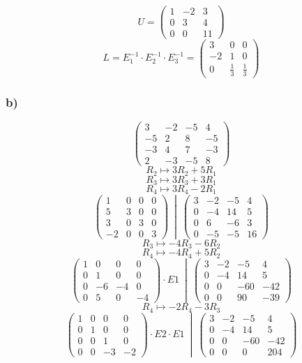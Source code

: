 \documentclass[lineaire_algebra_oplossingen.tex]{subfiles}
\begin{document}
\[ U = 
\begin{pmatrix}
1 & -2 & 3\\
0 & 3 & 4\\
0 & 0 & 11
\end{pmatrix}
\]
\[ L = E_1^{-1} \cdot E_2^{-1} \cdot E_3^{-1}
= \begin{pmatrix}
3 & 0 & 0\\
-2 & 1 & 0\\
0 & \frac{1}{3} & \frac{1}{3}
\end{pmatrix}
\]

\subsubsection*{b)}
\[
\begin{pmatrix}
3 & -2 & -5 & 4\\
-5 & 2 & 8 & -5\\
-3 & 4 & 7 & -3\\
2 & -3 & -5 & 8
\end{pmatrix}
\]
\[ R_2 \longmapsto 3R_2 + 5R_1 \]
\[ R_3 \longmapsto 3R_3 + 3R_1 \]
\[ R_4 \longmapsto 3R_4 - 2R_1 \]
\[
\left.\begin{pmatrix}
1 & 0 & 0 & 0\\
5 & 3 & 0 & 0\\
3 & 0 & 3 & 0\\
-2 & 0 & 0 & 3
\end{pmatrix}
\ \middle|\ 
\begin{pmatrix}
3 & -2 & -5 & 4\\
0 & -4 & 14 & 5\\
0 & 6 & -6 & 3\\
0 & -5 & -5 & 16
\end{pmatrix}\right.
\]
\[ R_3 \longmapsto -4R_3 - 6R_2 \]
\[ R_4 \longmapsto -4R_4 + 5R_2\]
\[
\left.\begin{pmatrix}
1 & 0 & 0 & 0\\
0 & 1 & 0 & 0\\
0 & -6 & -4 & 0\\
0 & 5 & 0 & -4
\end{pmatrix}
\cdot E1
\ \middle|\ 
\begin{pmatrix}
3 & -2 & -5 & 4\\
0 & -4 & 14 & 5\\
0 & 0 & -60 & -42\\
0 & 0 & 90 & -39
\end{pmatrix}\right.
\]
\[ R_4 \longmapsto -2R_4 - 3R_3 \]
\[
\left.\begin{pmatrix}
1 & 0 & 0 & 0\\
0 & 1 & 0 & 0\\
0 & 0 & 1 & 0\\
0 & 0 & -3 & -2
\end{pmatrix}
\cdot E2 \cdot E1
\ \middle|\ 
\begin{pmatrix}
3 & -2 & -5 & 4\\
0 & -4 & 14 & 5\\
0 & 0 & -60 & -42\\
0 & 0 & 0 & 204
\end{pmatrix}\right.
\]
\end{document}
